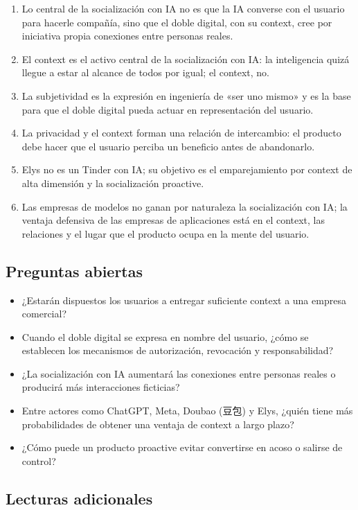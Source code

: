 \documentclass[a4paper]{article}
\begin{document}
\begin{enumerate}
\item Lo central de la socialización con IA no es que la IA converse con el usuario para hacerle compañía, sino que el doble digital, con su context, cree por iniciativa propia conexiones entre personas reales.
\item El context es el activo central de la socialización con IA: la inteligencia quizá llegue a estar al alcance de todos por igual; el context, no.
\item La subjetividad es la expresión en ingeniería de «ser uno mismo» y es la base para que el doble digital pueda actuar en representación del usuario.
\item La privacidad y el context forman una relación de intercambio: el producto debe hacer que el usuario perciba un beneficio antes de abandonarlo.
\item Elys no es un Tinder con IA; su objetivo es el emparejamiento por context de alta dimensión y la socialización proactive.
\item Las empresas de modelos no ganan por naturaleza la socialización con IA; la ventaja defensiva de las empresas de aplicaciones está en el context, las relaciones y el lugar que el producto ocupa en la mente del usuario.
\end{enumerate}

\subsection{Preguntas abiertas}

\begin{itemize}
\item ¿Estarán dispuestos los usuarios a entregar suficiente context a una empresa comercial?
\item Cuando el doble digital se expresa en nombre del usuario, ¿cómo se establecen los mecanismos de autorización, revocación y responsabilidad?
\item ¿La socialización con IA aumentará las conexiones entre personas reales o producirá más interacciones ficticias?
\item Entre actores como ChatGPT, Meta, Doubao (豆包) y Elys, ¿quién tiene más probabilidades de obtener una ventaja de context a largo plazo?
\item ¿Cómo puede un producto proactive evitar convertirse en acoso o salirse de control?
\end{itemize}

\subsection{Lecturas adicionales}
\end{document}
